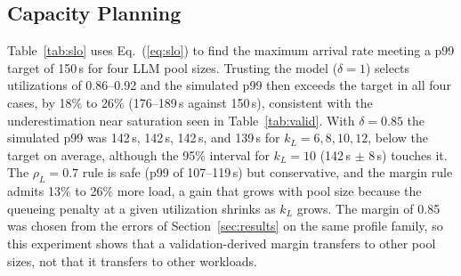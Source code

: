 \documentclass[journal]{IEEEtran}
\begin{document}
\subsection{Capacity Planning}
Table~\ref{tab:slo} uses Eq.~(\ref{eq:slo}) to find the maximum arrival rate meeting a p99 target of 150\,s for four LLM pool sizes. Trusting the model ($\delta=1$) selects utilizations of 0.86--0.92 and the simulated p99 then exceeds the target in all four cases, by 18\% to 26\% (176--189\,s against 150\,s), consistent with the underestimation near saturation seen in Table~\ref{tab:valid}. With $\delta=0.85$ the simulated p99 was 142\,s, 142\,s, 142\,s, and 139\,s for $k_L=6,8,10,12$, below the target on average, although the 95\% interval for $k_L=10$ (142\,s $\pm$ 8\,s) touches it. The $\rho_L=0.7$ rule is safe (p99 of 107--119\,s) but conservative, and the margin rule admits 13\% to 26\% more load, a gain that grows with pool size because the queueing penalty at a given utilization shrinks as $k_L$ grows. The margin of 0.85 was chosen from the errors of Section~\ref{sec:results} on the same profile family, so this experiment shows that a validation-derived margin transfers to other pool sizes, not that it transfers to other workloads.
\end{document}
